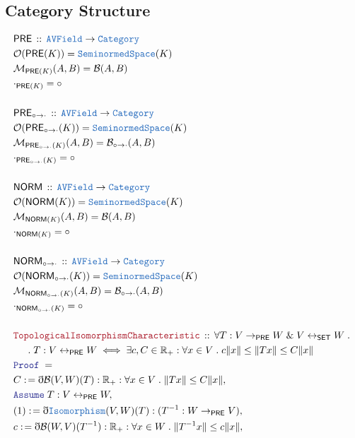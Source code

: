 \documentclass[12pt]{scrartcl}
\newcommand{\TYPE}[1]{\textcolor{NavyBlue}{\mathtt{#1}}}
\newcommand{\LOGIC}[1]{\textcolor{Blue}{\mathtt{#1}}}
\newcommand{\THM}[1]{\textcolor{Maroon}{\mathtt{#1}}}
\renewcommand{\.}{\; . \;}
\newcommand{\de}{: \kern 0.1pc =}
\newcommand{\Theorem}[2]{& \THM{#1} \, :: \, #2 \\ & \Proof = \\ }
\newcommand{\NewLine}{\\ & \kern 1pc}
\newcommand{\Page}[1]{\begin{align*} #1 \end{align*} \newpage   }
\newcommand{ \bd }{ \ByDef }
\renewcommand{\And}{\; \& \;}
\newcommand{\Reals}{\mathbb{R} }
\newcommand{\Cate}{\TYPE{Category}}
\newcommand{\Mor}{\mathcal{M}}
\newcommand{\Obj}{\mathcal{O}}
\newcommand{\Say}[3]{& #1 \de #2 : #3, \\}
\newcommand{\A}{\LOGIC{Assume} \;}
\newcommand{\Assume}[2]{& \A #1 : #2, \\}
\newcommand{\ByDef}{\eth}
\newcommand{\Proof}{\LOGIC{Proof} \; }
\newcommand{\SNS}{\TYPE{SeminormedSpace}} %
\newcommand{\PRE}{\mathsf{PRE}} %
\newcommand{\B}{\mathcal{B}}
\begin{document}
  \subsection{Category Structure}
\Page{
       & \mathsf{PRE} \, :: \, \TYPE{AVField} \to \Cate \\
       & \Obj(\mathsf{PRE}(K)) = \SNS(K) \\
       & \Mor_{\mathsf{PRE}(K)}(A,B) = \B(A,B) \\
       &  \cdot_{\mathsf{PRE}(K)} = \circ \\
       \\  
       & \mathsf{PRE}_{\circ \to \cdot} \, :: \, \TYPE{AVField} \to \Cate \\
       & \Obj(\mathsf{PRE}_{\circ \to \cdot} (K)) = \SNS(K) \\
       & \Mor_{\mathsf{PRE}_{\circ \to \cdot} (K)}(A,B) = \B_{\circ \to \cdot} (A,B) \\
       &  \cdot_{\mathsf{PRE}_{\circ \to \cdot} (K)} = \circ \\
       \\
         & \mathsf{NORM} \, :: \, \TYPE{AVField} \to \Cate \\
       & \Obj(\mathsf{NORM}(K)) = \SNS(K) \\
       & \Mor_{\mathsf{NORM}(K)}(A,B) = \B(A,B) \\
       &  \cdot_{\mathsf{NORM}(K)} = \circ \\
       \\  
       & \mathsf{NORM}_{\circ \to \cdot} \, :: \, \TYPE{AVField} \to \Cate \\
       & \Obj(\mathsf{NORM}_{\circ \to \cdot} (K)) = \SNS(K) \\
       & \Mor_{\mathsf{NORM}_{\circ \to \cdot} (K)}(A,B) = \B_{\circ \to \cdot} (A,B) \\
       &  \cdot_{\mathsf{NORM}_{\circ \to \cdot} (K)} = \circ \\
       \\
       \Theorem{TopologicalIsomorphismCharacteristic}
       { \forall T : V \to_{\PRE} W  \And V \leftrightarrow_{\mathsf{SET}} W
           \. \NewLine \.  T : V \leftrightarrow_{\PRE} W 
            \iff \exists c,C \in \Reals_+ : \forall x \in V \. c\| x \| \le \| Tx \| \le C\|x \|
        }
\Say{C}{\bd \B(V,W)(T) }{ \Reals_+ : \forall x \in V \. \| Tx \| \le C\|x \| }
\Assume{ T }{ V \leftrightarrow_{\PRE} W  }
\Say{(1)}{ \bd \TYPE{Isomorphism}(V,W)(T)}{(T^{-1} : W \to_{\PRE} V)}
\Say{c}{ \bd \B(W,V)(T^{-1})}{\Reals_+ : \forall x \in W \.  \| T^{-1}x \| \le c\| x\| }
}
\end{document}
